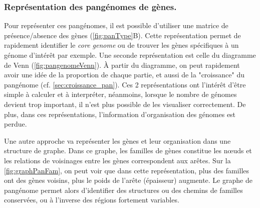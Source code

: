 
\subsubsection{Représentation des pangénomes de gènes.}

Pour représenter ces pangénomes, il est possible d'utiliser une matrice de présence/absence des gènes (\autoref{fig:panType}B). Cette représentation permet de rapidement identifier le \textit{core genome} ou de trouver les gènes spécifiques à un génome d'intérêt par exemple. Une seconde représentation est celle du diagramme de Venn (\autoref{fig:pangenomeVenn}). À partir du diagramme, on peut rapidement avoir une idée de la proportion de chaque partie, et aussi de la "croissance" du pangénome (cf. \autoref{sec:croissance_pan}). Ces 2 représentations ont l'intérêt d'être simple à calculer et à interpréter, néanmoins, lorsque le nombre de génomes devient trop important, il n'est plus possible de les visualiser correctement. De plus, dans ces représentations, l'information d'organisation des génomes est perdue. 

Une autre approche va représenter les gènes et leur organisation dans une structure de graphe. Dans ce graphe, les familles de gènes constitue les n\oe uds et les relations de voisinages entre les gènes correspondent aux arêtes. Sur la \autoref{fig:graphPanFam}, on peut voir que dans cette représentation, plus des familles ont des gènes voisins, plus le poids de l'arête (épaisseur) augmente. Le graphe de pangénome permet alors d'identifier des structures ou des chemins de familles conservées, ou à l'inverse des régions fortement variables.

